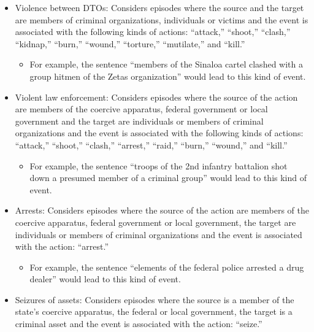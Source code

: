 \documentclass[12pt,letterpaper]{article}
\begin{document}
\begin{itemize} \itemsep-0.4em
    
    \item Violence between DTOs: Considers episodes where the source and the target are members of criminal organizations, individuals or victims and the event is associated with the following kinds of actions:  ``attack,'' ``shoot,'' ``clash,''  ``kidnap,''  ``burn,'' ``wound,'' ``torture,'' ``mutilate,'' and ``kill.''   
        
        \begin{itemize}
        \item For example, the sentence ``members of the Sinaloa cartel clashed with a group hitmen of the Zetas organization'' would lead to this kind of event. 
        \end{itemize}
    
    \item Violent law enforcement:  Considers episodes where the source of the action are members of the coercive apparatus, federal government or local government and the target are individuals or members of criminal organizations and the event is associated with the following kinds of actions:  ``attack,''  ``shoot,''  ``clash,'' ``arrest,''  ``raid,'' ``burn,'' ``wound,''  and ``kill.''
        
        \begin{itemize}
        \item For example, the sentence ``troops of the 2nd infantry battalion shot down a presumed member of a criminal group'' would lead to this kind of event. 
        \end{itemize}
        
    \item Arrests:  Considers episodes where the source of the action are members of the coercive apparatus, federal government or local government, the target are individuals or members of criminal organizations and the event is associated with the action: ``arrest.'' 
        
        \begin{itemize}
        \item For example, the sentence ``elements of the federal police arrested a drug dealer'' would lead to this kind of event. 
        \end{itemize}
        
    \item Seizures of assets: Considers episodes where the source is a member of the state's coercive apparatus, the federal or local government, the target is a criminal asset and the event is associated with the action: ``seize.'' 
        

\end{itemize}
\end{document}
